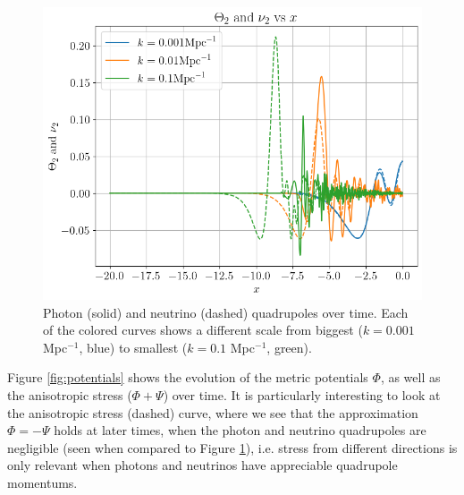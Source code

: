 \documentclass{aa}
\begin{document}
\begin{figure}[ht]
    \centering
    \includegraphics[width=\hsize]{report/figures/Theta2_Nu2.png}
    \caption{Photon (solid) and neutrino (dashed) quadrupoles over time. Each of the colored curves shows a different scale from biggest ($k = 0.001$ Mpc$^{-1}$, blue) to smallest ($k=0.1$ Mpc$^{-1}$, green).}
    \label{fig:theta2-nu2}
\end{figure}

Figure \ref{fig:potentials} shows the evolution of the metric potentials $\Phi$, as well as the anisotropic stress ($\Phi +\Psi$) over time. It is particularly interesting to look at the anisotropic stress (dashed) curve, where we see that the approximation $\Phi = - \Psi$ holds at later times, when the photon and neutrino quadrupoles are negligible (seen when compared to Figure \ref{fig:theta2-nu2}), i.e. stress from different directions is only relevant when photons and neutrinos have appreciable quadrupole momentums.
\end{document}
